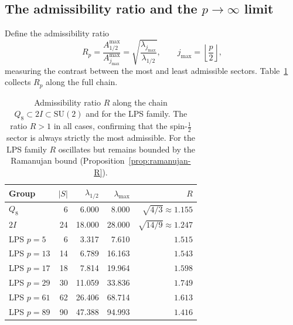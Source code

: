 \documentclass[11pt,a4paper]{article}
\begin{document}
\subsection{The admissibility ratio and the $p \to \infty$ limit}
  \label{sec:step6d}

  Define the admissibility ratio
  \begin{equation}
    R_p = \frac{A^{\max}_{1/2}}{A^{\max}_{j_{\max}}}
    = \sqrt{\frac{\lambda_{j_{\max}}}{\lambda_{1/2}}},
    \qquad
    j_{\max} = \left\lfloor \frac{p}{2} \right\rfloor,
    \label{eq:ratio-lps}
  \end{equation}
  measuring the contrast between the most and least admissible sectors.
  Table~\ref{tab:lps-chain} collects $R_p$ along the full chain.

  \begin{table}[h]
    \centering
    \renewcommand{\arraystretch}{1.25}
    \begin{tabular}{lrrrr}
      \hline
      Group        & $|S|$ & $\lambda_{1/2}$ & $\lambda_{\max}$ & $R$                         \\
      \hline
      $Q_8$        & 6     & 6.000           & 8.000            & $\sqrt{4/3} \approx 1.155$  \\
      $2I$         & 24    & 18.000          & 28.000           & $\sqrt{14/9} \approx 1.247$ \\
      LPS $p = 5$  & 6     & 3.317           & 7.610            & $1.515$                     \\
      LPS $p = 13$ & 14    & 6.789           & 16.163           & $1.543$                     \\
      LPS $p = 17$ & 18    & 7.814           & 19.964           & $1.598$                     \\
      LPS $p = 29$ & 30    & 11.059          & 33.836           & $1.749$                     \\
      LPS $p = 61$ & 62    & 26.406          & 68.714           & $1.613$                     \\
      LPS $p = 89$ & 90    & 47.388          & 94.993           & $1.416$                     \\
      \hline
    \end{tabular}
    \caption{Admissibility ratio $R$ along the chain
      $Q_8 \subset 2I \subset \mathrm{SU}(2)$ and for the LPS family.
      The ratio $R > 1$ in all cases, confirming that the spin-$\tfrac{1}{2}$
      sector is always strictly the most admissible.
      For the LPS family $R$ oscillates but remains bounded by the Ramanujan
      bound (Proposition~\ref{prop:ramanujan-R}).}
    \label{tab:lps-chain}
  \end{table}
\end{document}
